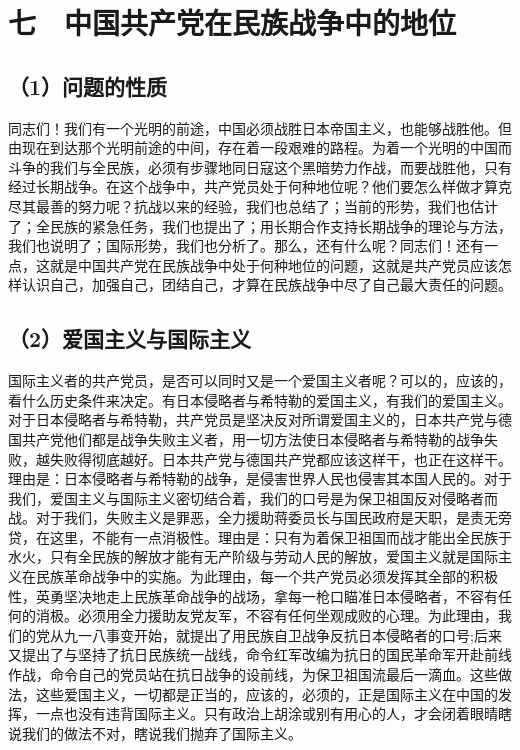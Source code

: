 \section{七　中国共产党在民族战争中的地位}

\subsection{（1）问题的性质}

同志们！我们有一个光明的前途，中国必须战胜日本帝国主义，也能够战胜他。但由现在到达那个光明前途的中间，存在着一段艰难的路程。为着一个光明的中国而斗争的我们与全民族，必须有步骤地同日寇这个黑暗势力作战，而要战胜他，只有经过长期战争。在这个战争中，共产党员处于何种地位呢？他们要怎么样做才算克尽其最善的努力呢？抗战以来的经验，我们也总结了；当前的形势，我们也估计了；全民族的紧急任务，我们也提出了；用长期合作支持长期战争的理论与方法，我们也说明了；国际形势，我们也分析了。那么，还有什么呢？同志们！还有一点，这就是中国共产党在民族战争中处于何种地位的问题，这就是共产党员应该怎样认识自己，加强自己，团结自己，才算在民族战争中尽了自己最大责任的问题。

\subsection{（2）爱国主义与国际主义}

国际主义者的共产党员，是否可以同时又是一个爱国主义者呢？可以的，应该的，看什么历史条件来决定。有日本侵略者与希特勒的爱国主义，有我们的爱国主义。对于日本侵略者与希特勒，共产党员是坚决反对所谓爱国主义的，日本共产党与德国共产党他们都是战争失败主义者，用一切方法使日本侵略者与希特勒的战争失败，越失败得彻底越好。日本共产党与德国共产党都应该这样干，也正在这样干。理由是：日本侵略者与希特勒的战争，是侵害世界人民也侵害其本国人民的。对于我们，爱国主义与国际主义密切结合着，我们的口号是为保卫祖国反对侵略者而战。对于我们，失败主义是罪恶，全力援助蒋委员长与国民政府是天职，是责无旁贷，在这里，不能有一点消极性。理由是：只有为着保卫祖国而战才能出全民族于水火，只有全民族的解放才能有无产阶级与劳动人民的解放，爱国主义就是国际主义在民族革命战争中的实施。为此理由，每一个共产党员必须发挥其全部的积极性，英勇坚决地走上民族革命战争的战场，拿每一枪口瞄准日本侵略者，不容有任何的消极。必须用全力援助友党友军，不容有任何坐观成败的心理。为此理由，我们的党从九一八事变开始，就提出了用民族自卫战争反抗日本侵略者的口号;后来又提出了与坚持了抗日民族统一战线，命令红军改编为抗日的国民革命军开赴前线作战，命令自己的党员站在抗日战争的设前线，为保卫祖国流最后一滴血。这些做法，这些爱国主义，一切都是正当的，应该的，必须的，正是国际主义在中国的发挥，一点也没有违背国际主义。只有政治上胡涂或别有用心的人，才会闭着眼晴瞎说我们的做法不对，瞎说我们抛弃了国际主义。

